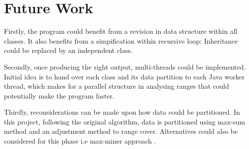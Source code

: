 \chapter{Future Work}	

Firstly, the program could benefit from a revision in data structure within all classes. It also benefits from a simpification within recursive loop: Inheritance could be replaced by an independent class.

Secondly, once producing the right output, multi-threads could be implemented. Initial idea is to hand over each class and its data partition to each Java worker thread, which makes for a parallel structure in analysing ranges that could potentially make the program faster.

Thirdly, reconsiderations can be made upon how data could be partitioned. In this project, following the original algorithm, data is partitioned using max-sum method and an adjustment method to range cover. Alternatives could also be considered for this phase i.e max-miner approach \cite{maxminer}.